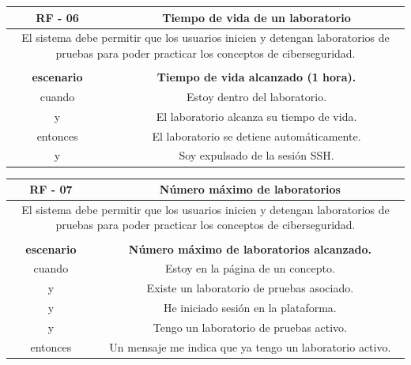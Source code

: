         \begin{table}[!htbp]
            \centering

            \begin{tabular}{|c|c|}
                \hline
                \textbf{RF - 06} & \textbf{Tiempo de vida de un laboratorio} \\
                \hline
                \multicolumn{2}{|p{15cm}|}{
                    El sistema debe permitir que los usuarios inicien y detengan laboratorios de pruebas para poder practicar los conceptos de ciberseguridad.
                } \\
                \hline
                \multicolumn{2}{|p{15cm}|}{
                } \\
                \hline
                \textbf{escenario} & \textbf{Tiempo de vida alcanzado (1 hora).} \\
                cuando & Estoy dentro del laboratorio.\\
                y & El laboratorio alcanza su tiempo de vida. \\
                entonces & El laboratorio se detiene automáticamente. \\
                y & Soy expulsado de la sesión SSH. \\
                \hline
            \end{tabular}
        \end{table}

        \newpage

        \begin{table}[!htbp]
            \centering

            \begin{tabular}{|c|c|}
                \hline
                \textbf{RF - 07} & \textbf{Número máximo de laboratorios} \\
                \hline
                \multicolumn{2}{|p{15cm}|}{
                    El sistema debe permitir que los usuarios inicien y detengan laboratorios de pruebas para poder practicar los conceptos de ciberseguridad.
                } \\
                \hline
                \multicolumn{2}{|p{15cm}|}{
                } \\
                \hline
                \textbf{escenario} & \textbf{Número máximo de laboratorios alcanzado.} \\
                cuando & Estoy en la página de un concepto. \\
                y & Existe un laboratorio de pruebas asociado. \\
                y & He iniciado sesión en la plataforma. \\
                y & Tengo un laboratorio de pruebas activo. \\
                entonces & Un mensaje me indica que ya tengo un laboratorio activo. \\
                \hline
            \end{tabular}
        \end{table}

